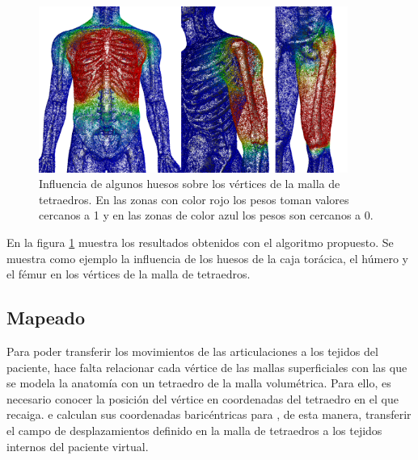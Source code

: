  \begin{figure}[h]
   \centering
\includegraphics[width=0.9\textwidth]{IMG/weights.png}
     \caption{Influencia de algunos huesos sobre los vértices  de la malla de tetraedros. En las zonas con color rojo\new{,} los pesos toman valores cercanos a 1 y en las zonas de color azul\new{,} los pesos son cercanos a 0.}
      \label{fig:pesado}
\end{figure}
 
En la figura \ref{fig:pesado} muestra los resultados obtenidos con el algoritmo propuesto. Se muestra  como ejemplo la influencia de los huesos de la caja torácica, el húmero y el fémur en los vértices de la malla de tetraedros.

\subsection{Mapeado}
\label{posing:Mapeado}
%
Para poder transferir los movimientos de las articulaciones a los tejidos del paciente, hace falta relacionar cada vértice de las mallas superficiales con las que se modela la anatomía con un tetraedro de la malla volumétrica. Para ello, es necesario conocer la posición del vértice en coordenadas del tetraedro en el que recaiga. e calculan sus coordenadas baricéntricas para , de esta manera,  transferir el campo de desplazamientos definido en la malla de tetraedros\new{,} a los tejidos internos del paciente virtual.




%



